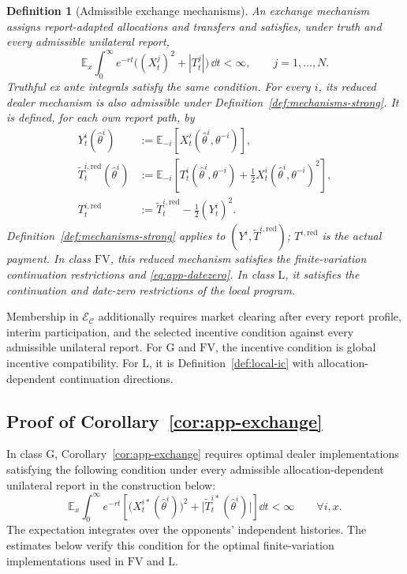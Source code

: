 \documentclass[12pt]{article}
\newtheorem{definition}{Definition}
\newcommand{\E}{\mathbb{E}}
\begin{document}
\begin{definition}[Admissible exchange mechanisms]
\label{def:exchange-mechanisms}
An exchange mechanism assigns report-adapted allocations and transfers
and satisfies, under truth and every admissible unilateral report,
\[
  \E_x\int_0^\infty e^{-rt}
       \bigl((X_t^j)^2+|T_t^j|\bigr)\,\dd t<\infty,
       \qquad j=1,\ldots,N.
\]
Truthful ex ante integrals satisfy the same condition. For every \(i\),
its reduced dealer mechanism is also admissible under
Definition~\ref{def:mechanisms-strong}. It is defined, for each own
report path, by
\[
\begin{split}
  Y_t^i(\widehat\theta^i)
    &:=\E_{-i}[X_t^i(\widehat\theta^i,\theta^{-i})],\\
  \widetilde T_t^{i,\mathrm{red}}(\widehat\theta^i)
    &:=\E_{-i}\left[
       T_t^i(\widehat\theta^i,\theta^{-i})
        +\frac12X_t^i(\widehat\theta^i,\theta^{-i})^2\right],\\
  T_t^{i,\mathrm{red}}
    &:=\widetilde T_t^{i,\mathrm{red}}-\frac12(Y_t^i)^2 .
\end{split}
\]
Definition~\ref{def:mechanisms-strong} applies to
\((Y^i,\widetilde T^{i,\mathrm{red}})\);
\(T^{i,\mathrm{red}}\) is the actual payment.
In class \(\mathrm{FV}\), this reduced mechanism satisfies the
finite-variation continuation restrictions and
\eqref{eq:app-datezero}. In class \(\mathrm L\), it satisfies the
continuation and date-zero restrictions of the local program.
\end{definition}


Membership in \(\mathcal E_{\mathcal C}\) additionally requires market
clearing after every report profile, interim participation, and the
selected incentive condition against every admissible unilateral report.
For \(\mathrm G\) and \(\mathrm{FV}\), the incentive condition is global
incentive compatibility. For \(\mathrm L\), it is
Definition~\ref{def:local-ic} with allocation-dependent continuation
directions.




\subsection{Proof of Corollary~\ref{cor:app-exchange}}
\label{app:proof-exchange}

In class \(\mathrm G\), Corollary~\ref{cor:app-exchange} requires
optimal dealer implementations satisfying the following condition
under every admissible allocation-dependent unilateral report in the
construction below:
\begin{equation}\label{eq:app-exchange-implementation-integrability}
  \E_x\int_0^\infty e^{-rt}
  \left[
    \bigl(X_t^{i\ast}(\widehat\theta^i)\bigr)^2
       +\bigl|\widetilde T_t^{i\ast}(\widehat\theta^i)\bigr|
  \right]\dd t<\infty
  \qquad\forall i,x.
\end{equation}
The expectation integrates over the opponents' independent histories.
The estimates below verify this condition for the optimal
finite-variation implementations used in \(\mathrm{FV}\) and
\(\mathrm L\).
\end{document}
